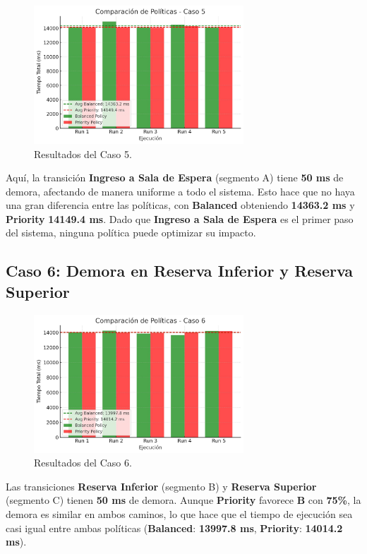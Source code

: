 \documentclass[12pt]{article}
\begin{document}
\begin{figure}[H]
    \centering
    \includegraphics[width=0.7\textwidth]{CASO_5.jpeg}
    \caption{Resultados del Caso 5.}
\end{figure}

Aquí, la transición \textbf{Ingreso a Sala de Espera} (segmento A) tiene \textbf{50 ms} de demora, afectando de manera uniforme a todo el sistema. Esto hace que no haya una gran diferencia entre las políticas, con \textbf{Balanced} obteniendo \textbf{14363.2 ms} y \textbf{Priority} \textbf{14149.4 ms}. Dado que \textbf{Ingreso a Sala de Espera} es el primer paso del sistema, ninguna política puede optimizar su impacto.

\subsection{Caso 6: Demora en Reserva Inferior y Reserva Superior}

\begin{figure}[H]
    \centering
    \includegraphics[width=0.7\textwidth]{CASO_6.jpeg}
    \caption{Resultados del Caso 6.}
\end{figure}

Las transiciones \textbf{Reserva Inferior} (segmento B) y \textbf{Reserva Superior} (segmento C) tienen \textbf{50 ms} de demora. Aunque \textbf{Priority} favorece \textbf{B} con \textbf{75\%}, la demora es similar en ambos caminos, lo que hace que el tiempo de ejecución sea casi igual entre ambas políticas (\textbf{Balanced}: \textbf{13997.8 ms}, \textbf{Priority}: \textbf{14014.2 ms}).
\end{document}
